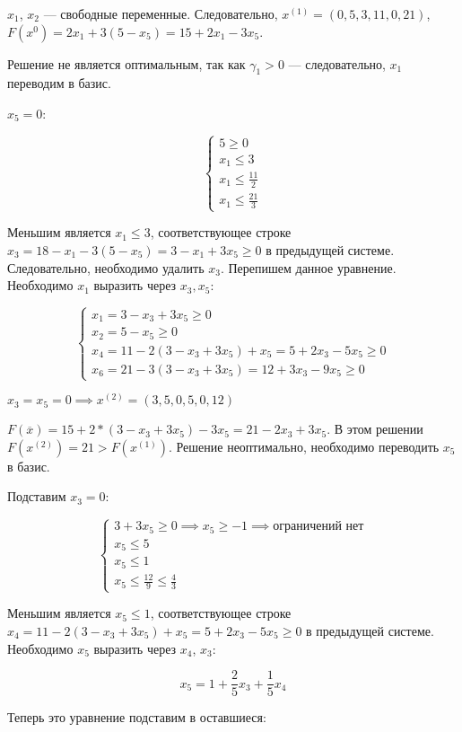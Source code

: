 \documentclass{article}
\begin{document}
$x_1$, $x_2$ — свободные переменные. Следовательно, $x^{(1)} = (0,5,3,11,0,21)$, $F(x^{0}) = 2x_1 + 3 (5 - x_5) = 15 + 2x_1 - 3x_5$.

Решение не является оптимальным, так как $\gamma_1 > 0$ — следовательно, $x_1$ переводим в базис.

$x_5 = 0$:

$$
\begin{cases}
    5 \ge 0 \\
    x_1 \le 3 \\
    x_1 \le \frac{11}{2} \\
    x_1 \le \frac{21}{3}  
\end{cases}
$$

Меньшим является $x_{1} \le 3$, соответствующее строке $x_3 = 18 - x_1 - 3 (5 - x_5) = 3 - x_1 + 3x_5 \ge 0$ в предыдущей системе. Следовательно, необходимо удалить $x_3$. Перепишем данное уравнение. Необходимо $x_1$ выразить через $x_3, x_5$:

$$\begin{cases}
    x_1 = 3 - x_3 + 3x_5 \ge 0 \\
    x_2 = 5 - x_5 \ge 0 \\
    x_4 = 11 - 2 (3 - x_3 + 3x_5) + x_5 = 5 + 2x_3 - 5x_5 \ge 0\\
    x_6 = 21 - 3 (3 - x_3 + 3x_5) = 12 + 3x_3 - 9x_5 \ge 0
\end{cases}$$

$x_3 = x_5 = 0 \implies x^{(2)} = (3,5,0,5,0,12)$

$F(\overline{x}) = 15 + 2 * (3 - x_3 + 3x_5) - 3x_5 = 21 - 2x_3 + 3x_5$. В этом решении $F(x^{(2)}) = 21 > F(x^{(1)})$. Решение неоптимально, необходимо переводить $x_5$ в базис.

Подставим $x_3 = 0$:

$$
\begin{cases}
    3 + 3x_5 \ge 0 \implies x_5 \ge -1 \implies \text{ограничений нет}\\
    x_5 \le 5 \\
    x_5 \le 1 \\
    x_5 \le \frac{12}{9} \le \frac{4}{3}
\end{cases}
$$

Меньшим является $x_{5} \le 1$, соответствующее строке $x_4 = 11 - 2 (3 - x_3 + 3x_5) + x_5 = 5 + 2x_3 - 5x_5 \ge 0$ в предыдущей системе. Необходимо $x_5$ выразить через $x_4$, $x_3$:

$$
x_5 = 1 + \frac{2}{5} x_3 + \frac{1}{5} x_4
$$

Теперь это уравнение подставим в оставшиеся:
\end{document}
